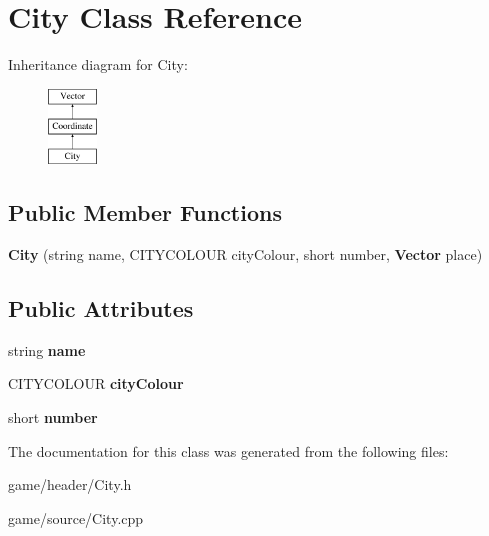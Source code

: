 \section{City Class Reference}
\label{class_city}
Inheritance diagram for City\-:\begin{figure}[H]
\begin{center}
\leavevmode
\includegraphics[height=2.000000cm]{class_city}
\end{center}
\end{figure}
\subsection*{Public Member Functions}
\begin{DoxyCompactItemize}
\item 
{\bfseries City} (string name, C\-I\-T\-Y\-C\-O\-L\-O\-U\-R city\-Colour, short number, {\bf Vector} place)\label{class_city_a086f1d9fd30ad0bcedcf72d526cbf365}

\end{DoxyCompactItemize}
\subsection*{Public Attributes}
\begin{DoxyCompactItemize}
\item 
string {\bfseries name}\label{class_city_a38b5e8b9bd4e263434eae0344913d341}

\item 
C\-I\-T\-Y\-C\-O\-L\-O\-U\-R {\bfseries city\-Colour}\label{class_city_a49ce7573be0c500755ffc346399a7ae3}

\item 
short {\bfseries number}\label{class_city_a0fecf97dc1cbd61bb1bd27325decad52}

\end{DoxyCompactItemize}


The documentation for this class was generated from the following files\-:\begin{DoxyCompactItemize}
\item 
game/header/City.\-h\item 
game/source/City.\-cpp\end{DoxyCompactItemize}
